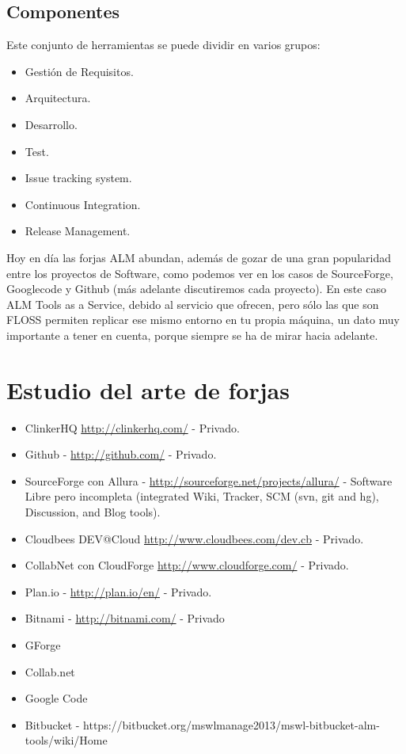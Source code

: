 \subsection{Componentes}
\label{sub:componentes}

\par Este conjunto de herramientas se puede dividir en varios grupos:

\begin{itemize}
	\item Gesti\'on de Requisitos.
	\item Arquitectura.
	\item Desarrollo.
	\item Test.
	\item Issue tracking system.
	\item Continuous Integration.
	\item Release Management.
\end{itemize}

\par Hoy en d\'ia las forjas ALM abundan, adem\'as de gozar de una gran popularidad entre los proyectos de Software, como podemos ver en los casos de SourceForge, Googlecode y Github (más adelante discutiremos cada proyecto). En este caso ALM Tools as a Service, debido al servicio que ofrecen, pero sólo las que son FLOSS permiten replicar ese mismo entorno en tu propia máquina, un dato muy importante a tener en cuenta, porque siempre se ha de mirar hacia adelante.


\section{Estudio del arte de forjas}
\label{sec:estado-del-arte}

\begin{itemize}
	\item ClinkerHQ \url{http://clinkerhq.com/} - Privado.
	\item Github - \url{http://github.com/} - Privado.
	\item SourceForge con Allura - \url{http://sourceforge.net/projects/allura/} - Software Libre pero incompleta (integrated Wiki, Tracker, SCM (svn, git and hg), Discussion, and Blog tools).
	\item Cloudbees DEV@Cloud \url{http://www.cloudbees.com/dev.cb} - Privado.
	\item CollabNet con CloudForge \url{http://www.cloudforge.com/} - Privado.
	\item Plan.io - \url{http://plan.io/en/} - Privado.
	\item Bitnami - \url{http://bitnami.com/} - Privado
	\item GForge
	\item Collab.net
	\item Google Code
	\item Bitbucket - https://bitbucket.org/mswlmanage2013/mswl-bitbucket-alm-tools/wiki/Home
\end{itemize}

